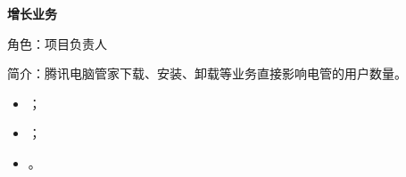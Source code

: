 \documentclass{resume}
\begin{document}
\vspace{2.0ex}
{\textbf{\large{增长业务}}}
\vspace{0.5ex}
\par{角色：项目负责人}
\par{简介：腾讯电脑管家下载、安装、卸载等业务直接影响电管的用户数量。}
\begin{itemize}
  \item ；
  \item ；
  \item 。
\end{itemize}



\end{document}
